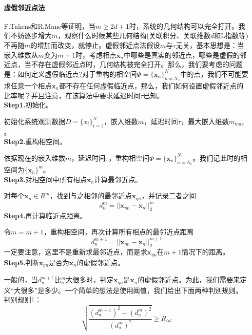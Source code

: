             \paragraph{虚假邻近点法}
            F.Takens和R.Mane等证明，当$m\geq 2d+1$时，系统的几何结构可以完全打开。我们不妨逐步增大$m$，观察什么时候某些几何结构(关联积分、关联维数$d$和L指数等)不再随$m$的增加而改变，就停止。虚假邻近点法假设$m$与$\tau$无关，基本思想是：当嵌入维数从$m$变为$m+1$时，考虑相点$\mathbf{x}_n$中哪些是真实的邻近点，哪些是虚假的邻近点，当不存在虚假邻近点时，几何结构被完全打开。那么，我们要考虑的问题是：如何定义虚假临近点?对于重构的相空间$\Phi = \{\mathbf{x}_n\}_{n=N_0}^N$中的点，我们不可能要求任意一个相点$\mathbf{x}_n$都不存在任何虚假临近点，那么，我们如何设置虚假邻近点的比率呢？并且注意，在该算法中要求延迟时间$\tau$已知。
            \\
            \textbf{Step1.}初始化。\par
            初始化系统观测数据$D=\{x_t\}_{t=1}^N$，嵌入维数$m$，延迟时间$\tau$，最大嵌入维数$m_{max}$。\\
            \textbf{Step2.}重构相空间。\par
            依据现在的嵌入维数$m$，延迟时间$\tau$，重构相空间$\Phi = \{\mathbf{x}_n\}_{n=N_0}^N$。我们记此时的相空间为$\{\mathbf{x}_n\}^m$。\\
            \textbf{Step3.}对相空间中所有相点$\mathbf{x}_n$计算最邻近点。\par
            对每个$\mathbf{x}_n \in R^m$，找到与之相邻的最邻近点$\mathbf{x}_{\eta n}$，并记录二者之间
            \[
                d_n^m = ||\mathbf{x}_{\eta n} - \mathbf{x}_n||_2^m
            \]
            \textbf{Step4.}再计算临近点距离。\par
            令$m = m+1$，重构相空间，再次计算所有相点的最邻近点距离
            \[
                d_n^{m+1} = ||\mathbf{x}_{\eta n} - \mathbf{x}_n||_2^{m+1}
            \]
            一定要注意，这里不是重新求最邻近点，而是求$\mathbf{x}_{\eta n}$在$m+1$情况下的距离。\\
            \textbf{Step5.}判断$\mathbf{x}_{\eta n}$是否为$\mathbf{x}_n$的虚假邻近点。\par
            一般的，当$d_n^{m+1}$比$_n^m$大很多时，判定$\mathbf{x}_{\eta n}$是$\mathbf{x}_n$的虚假邻近点。为此，我们需要来定义“大很多”是多少。一个简单的想法是使用阈值，我们给出下面两种判别规则。\\
            判别规则1：
            \[
                \sqrt{\frac{(d_n^{m+1})^2 - (d_n^m)^2}{(d_n^m)^2}} \geq R_{tol}
            \]
